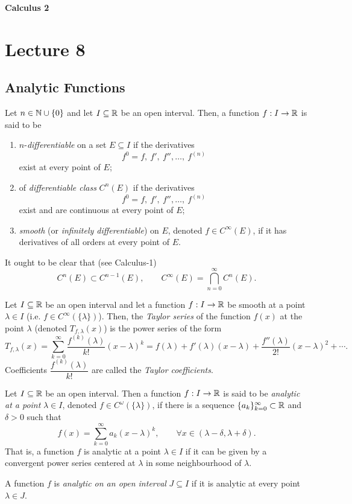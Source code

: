 
{\large\bfseries Calculus 2}

\section{Lecture 8}
\subsection*{Analytic Functions}

\begin{definition}\label{def:8.1}
Let $n\in\mathbb{N}\cup\{0\}$ and let $I\subseteq\mathbb{R}$ be an open interval. Then, a function $f:I\to\mathbb{R}$ is said to be
\begin{enumerate}[label=\alph*)]
    \item\label{item:definition:8.1:a} $n$-\emph{differentiable} on a set $E\subseteq I$ if the derivatives
    \[
    f^0=f,\ f',\ f'',\ldots,\ f^{(n)}
    \]
    exist at every point of $E$;
    \item\label{item:definition:8.1:b} of \emph{differentiable class} $C^n(E)$ if the derivatives
    \[
    f^0=f,\ f',\ f'',\ldots,\ f^{(n)}
    \]
    exist and are continuous at every point of $E$;
    \item\label{item:definition:8.1:c} \emph{smooth} (or \emph{infinitely differentiable}) on $E$, denoted $f\in C^\infty(E)$, if it has derivatives of all orders at every point of $E$.
\end{enumerate}
It ought to be clear that (see Calculus-1)
\[
C^n(E)\subset C^{n-1}(E),\qquad C^\infty(E)=\bigcap_{n=0}^{\infty}C^n(E).
\]
\end{definition}

\begin{definition}\label{def:8.2}
Let $I\subseteq\mathbb{R}$ be an open interval and let a function $f:I\to\mathbb{R}$ be smooth at a point $\lambda\in I$ (i.e. $f\in C^\infty(\{\lambda\})$). Then, the \emph{Taylor series} of the function $f(x)$ at the point $\lambda$ (denoted $T_{f,\lambda}(x)$) is the power series of the form
\[
T_{f,\lambda}(x)
=\sum_{k=0}^{\infty}\frac{f^{(k)}(\lambda)}{k!}(x-\lambda)^k
=f(\lambda)+f'(\lambda)(x-\lambda)+\frac{f''(\lambda)}{2!}(x-\lambda)^2+\cdots.
\tag{1}\label{eq:8:1:1}
\]
Coefficients $\dfrac{f^{(k)}(\lambda)}{k!}$ are called the \emph{Taylor coefficients}.
\end{definition}

\begin{definition}\label{def:8.3}
Let $I\subseteq\mathbb{R}$ be an open interval. Then a function $f:I\to\mathbb{R}$ is said to be \emph{analytic at a point} $\lambda\in I$, denoted $f\in C^\omega(\{\lambda\})$, if there is a sequence $\{a_k\}_{k=0}^{\infty}\subset\mathbb{R}$ and $\delta>0$ such that
\[
f(x)=\sum_{k=0}^{\infty}a_k(x-\lambda)^k,
\qquad \forall x\in(\lambda-\delta,\lambda+\delta).
\]
That is, a function $f$ is analytic at a point $\lambda\in I$ if it can be given by a convergent power series centered at $\lambda$ in some neighbourhood of $\lambda$.

A function $f$ is \emph{analytic on an open interval} $J\subseteq I$ if it is analytic at every point $\lambda\in J$.
\end{definition}

